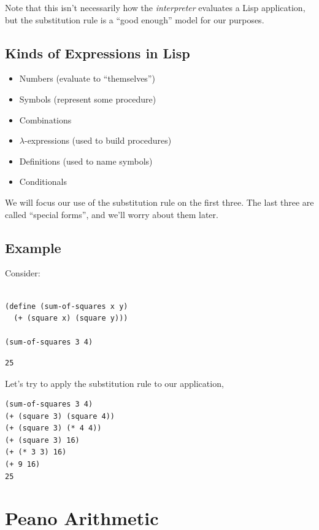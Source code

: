 \documentclass[9pt]{report}
\begin{document}
Note that this isn't necessarily how the \emph{interpreter} evaluates a
Lisp application, but the substitution rule is a ``good enough''
model for our purposes.

\subsection{Kinds of Expressions in Lisp}
\label{sec:org9f13b27}
\begin{itemize}
\item Numbers (evaluate to ``themselves'')
\item Symbols (represent some procedure)
\item Combinations
\item \(\lambda\)-expressions (used to build procedures)
\item Definitions (used to name symbols)
\item Conditionals
\end{itemize}

We will focus our use of the substitution rule on the first three.
The last three are called ``special forms'', and we'll worry about
them later.

\subsection{Example}
\label{sec:org4e7dfb9}

Consider:

\begin{verbatim}

(define (sum-of-squares x y)
  (+ (square x) (square y)))

(sum-of-squares 3 4)
\end{verbatim}

\begin{verbatim}
25
\end{verbatim}


Let's try to apply the substitution rule to our application,

\begin{verbatim}
(sum-of-squares 3 4)
(+ (square 3) (square 4))
(+ (square 3) (* 4 4))
(+ (square 3) 16)
(+ (* 3 3) 16)
(+ 9 16)
25
\end{verbatim}

\section{Peano Arithmetic}
\label{sec:orge46d549}
\end{document}
